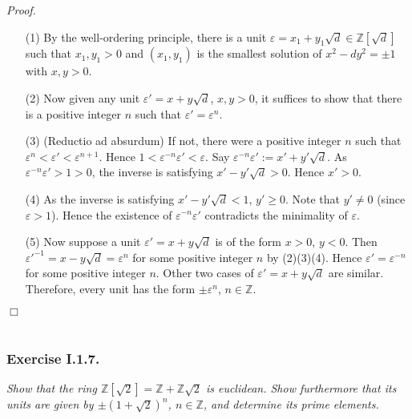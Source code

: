 \documentclass{article}
\begin{document}
\emph{Proof.}
\begin{enumerate}
\item[(1)]
  By the well-ordering principle,
  there is a unit $\varepsilon = x_1 + y_1\sqrt{d} \in \mathbb{Z}[\sqrt{d}]$ such that
  $x_1, y_1 > 0$ and $(x_1,y_1)$ is the smallest solution of $x^2 - dy^2 = \pm 1$ with $x, y > 0$.

\item[(2)]
  Now given any unit $\varepsilon' = x + y\sqrt{d}$, $x, y > 0$,
  it suffices to show that there is a positive integer $n$ such that $\varepsilon' = \varepsilon^n$.

\item[(3)]
  (Reductio ad absurdum)
  If not, there were a positive integer $n$ such that $\varepsilon^n < \varepsilon' < \varepsilon^{n+1}$.
  Hence $1 < \varepsilon^{-n} \varepsilon' < \varepsilon$.
  Say $\varepsilon^{-n} \varepsilon' := x' + y'\sqrt{d}$.
  As $\varepsilon^{-n} \varepsilon' > 1 > 0$, the inverse is satisfying $x' - y'\sqrt{d} > 0$.
  Hence $x' > 0$.

\item[(4)]
  As the inverse is satisfying $x' - y'\sqrt{d} < 1$, $y' \geq 0$.
  Note that $y' \neq 0$ (since $\varepsilon > 1$).
  Hence the existence of $\varepsilon^{-n} \varepsilon'$ contradicts the minimality of $\varepsilon$.

\item[(5)]
  Now suppose a unit $\varepsilon' = x + y\sqrt{d}$ is of the form $x > 0$, $y < 0$.
  Then $\varepsilon'^{-1} = x - y\sqrt{d} = \varepsilon^n$ for some positive integer $n$ by (2)(3)(4).
  Hence $\varepsilon' = \varepsilon^{-n}$ for some positive integer $n$.
  Other two cases of $\varepsilon' = x + y\sqrt{d}$ are similar.
  Therefore, every unit has the form $\pm \varepsilon^n$, $n \in \mathbb{Z}$.
\end{enumerate}
$\Box$ \\\\






\subsubsection*{Exercise I.1.7.}
\emph{Show that the ring $\mathbb{Z}[\sqrt{2}] = \mathbb{Z} + \mathbb{Z}\sqrt{2}$ is euclidean.
Show furthermore that its units are given by $\pm(1+\sqrt{2})^n$, $n \in \mathbb{Z}$,
and determine its prime elements.} \\
\end{document}
